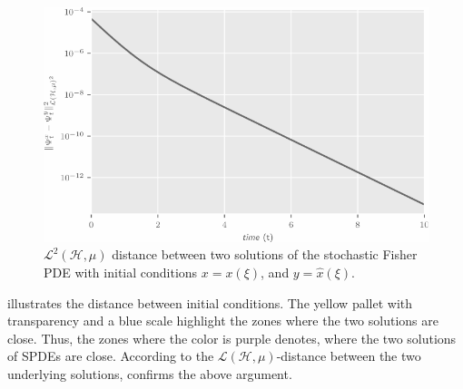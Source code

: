 %
%
%
\begin{figure}[H]
    \includegraphics[width=\textwidth]{StochasticFisherEquation/error_fisher.pdf}
    \caption{
        $\mathcal{L}^2(\mathcal{H}, \mu)$
        distance between two solutions of the stochastic Fisher PDE 
        with initial conditions $x = x(\xi)$, and  $y = \widehat{x}(\xi)$.
    }
    \label{fig:errorfisher}
\end{figure}

     illustrates the distance between initial 
conditions. The yellow pallet with transparency and a blue scale highlight the 
zones where the two solutions are close. Thus, the zones where the color is 
purple denotes, where the two solutions of SPDEs are close. 
According to the $\mathcal{L}( \mathcal{H}, \mu)$-distance between the two 
underlying solutions,  confirms the above argument.

%